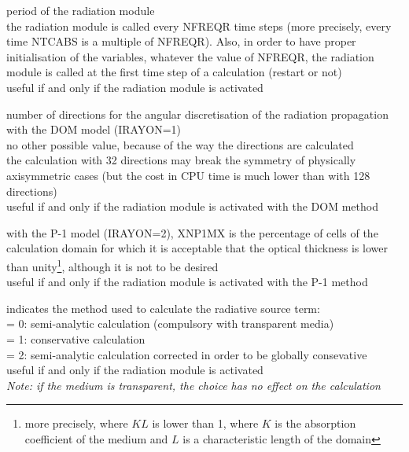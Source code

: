 {period of the radiation module\\
the radiation module is called every NFREQR time steps (more precisely, every
time NTCABS is a multiple of NFREQR). Also, in order to have proper
initialisation of the variables, whatever the value of NFREQR, the radiation 
module is called at the first time step of a calculation (restart or not)\\
useful if and only if the radiation module is activated}

{number of directions for the angular discretisation of the radiation
propagation with the DOM model (IRAYON=1)\\ 
no other possible value, because of the way the directions are calculated\\
the calculation with 32 directions may break the symmetry of
physically axisymmetric cases (but the cost in CPU time is much lower
 than with 128 directions)\\
useful if and only if the radiation module is activated with the DOM method}

{with the P-1 model (IRAYON=2), XNP1MX is the percentage of cells of
the calculation domain for which it is acceptable that the optical
thickness is lower than unity\footnote{more precisely, where $KL$ is lower than
1, where $K$ is the absorption coefficient of the medium and $L$ is a
characteristic length of the domain}, although it is not to be desired\\
useful if and only if the radiation module is activated with the P-1 method}

{indicates the method used to calculate the radiative source term:\\
\hspace*{1.3cm}= 0: semi-analytic calculation (compulsory with transparent
media)\\ 
\hspace*{1.3cm}= 1: conservative calculation\\
\hspace*{1.3cm}= 2: semi-analytic calculation corrected in order to be
globally consevative\\
useful if and only if the radiation module is activated\\
{\em Note: if the medium is transparent, the choice has no effect on the calculation}}

